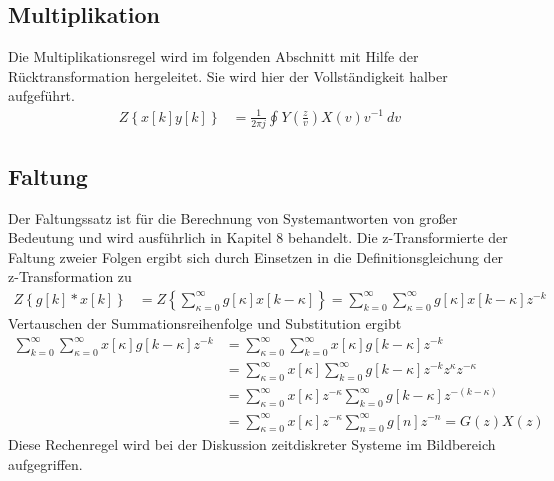 \subsection{Multiplikation}\label{sec:multiplikation}

Die Multiplikationsregel wird im folgenden Abschnitt mit Hilfe der Rücktransformation hergeleitet. Sie wird hier der Vollständigkeit halber aufgeführt.
\begin{align}
Z\left\{ x[ k]  y[ k] \right\} &= \frac{1}{2  \pi  j}  \oint_{}^{}{Y\left( \frac{z}{v} \right)  X(v)  v^{- 1}\ dv} \label{eq:5.68}
\end{align}
\subsection{Faltung}\label{sec:faltung}

Der Faltungssatz ist für die Berechnung von Systemantworten von großer Bedeutung und wird ausführlich in Kapitel 8 behandelt. Die z-Transformierte der Faltung zweier Folgen ergibt sich durch Einsetzen in die Definitionsgleichung der z-Transformation zu
\begin{align}
Z\left\{ g[ k]*x[ k] \right\} &= Z\left\{ \sum\limits_{\kappa = 0}^{\infty}{g[\kappa]  x[ k - \kappa]} \right\} = \sum\limits_{k = 0}^{\infty}{\sum\limits_{\kappa = 0}^{\infty}{g[\kappa]  x[ k - \kappa]}}  z^{- k} \label{eq:5.69}
\end{align}
Vertauschen der Summationsreihenfolge und Substitution ergibt
\begin{align}
{\sum\limits _{k=0}^{\infty }\sum\limits _{\kappa =0}^{\infty }x\left[\kappa \right] g\left[k-\kappa \right]   z^{-k} } &=  {\sum\limits _{\kappa =0}^{\infty }\sum\limits _{k=0}^{\infty }x\left[\kappa \right] g\left[k-\kappa \right]   z^{-k} } \\
{} &=  {\sum\limits _{\kappa =0}^{\infty }x\left[\kappa \right] \sum\limits _{k=0}^{\infty }g\left[k-\kappa \right]   z^{-k}  z^{\kappa }  z^{-\kappa } } \\
{} &=  {\sum\limits _{\kappa =0}^{\infty }x\left[\kappa \right] z^{-\kappa }  \sum\limits _{k=0}^{\infty }g\left[k-\kappa \right]   z^{-\left(k-\kappa \right)} } \\
{} &=  {\sum\limits _{\kappa =0}^{\infty }x\left[\kappa \right] z^{-\kappa }  \sum\limits _{n=0}^{\infty }g \left[n\right] z^{-n}   =G\left(z\right) X\left(z\right)}
\label{eq:5.70}
\end{align}
Diese Rechenregel wird bei der Diskussion zeitdiskreter Systeme im Bildbereich aufgegriffen.

